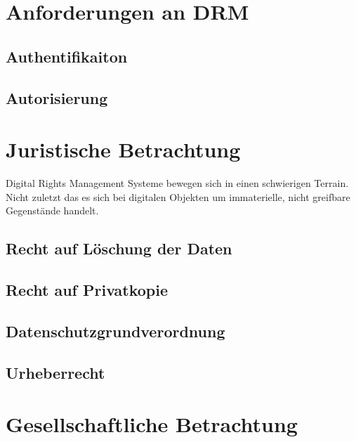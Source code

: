 \begin{spacing}{1.5}
\cite[S. 90 ff.]{LightWeightDRM}



\section{Anforderungen an DRM}
\label{sec: Anforderungen an DRM}
\subsection{Authentifikaiton}
\label{Authentifikation}
\subsection{Autorisierung}
\label{Autorisierung}

\section{Juristische Betrachtung}
Digital Rights Management Systeme bewegen sich in einen schwierigen Terrain. Nicht zuletzt das es sich bei digitalen Objekten um immaterielle, nicht greifbare Gegenstände handelt. 
\label{sec:Juristische Betrachtung}
\subsection{Recht auf Löschung der Daten}
\label{Recht auf Löschung der Daten}
\subsection{Recht auf Privatkopie}
\label{Recht auf Privatkopie}
\subsection{Datenschutzgrundverordnung}
\label{Datenschutzgrundverordnung}
\subsection{Urheberrecht}
\label{Urheberrecht}

\section{Gesellschaftliche Betrachtung}
\label{sec:Gesellschaftliche Betrachtung}


\end{spacing}

